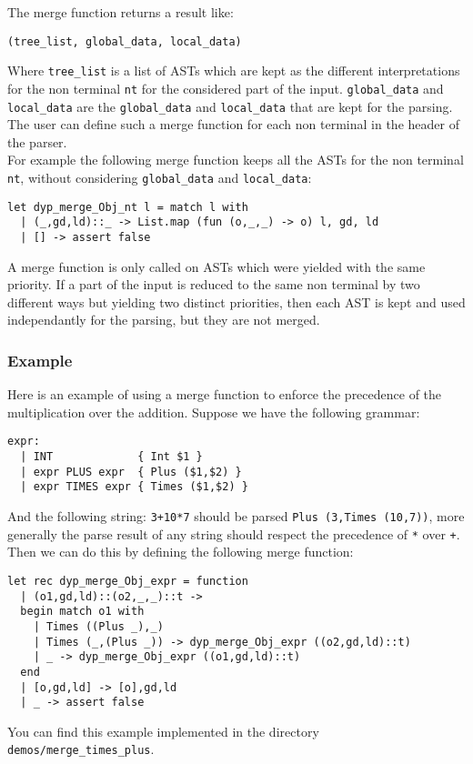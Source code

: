 \documentclass[12pt]{article}
\begin{document}
{The merge function returns a result like:
\begin{verbatim}
(tree_list, global_data, local_data)
\end{verbatim}
Where \verb|tree_list| is a list of ASTs which are kept as the different interpretations for the non terminal \verb|nt| for the considered part of the input. \verb|global_data| and \verb|local_data| are the \verb|global_data| and \verb|local_data| that are kept for the parsing.\\

The user can define such a merge function for each non terminal in the header of the parser.\\

For example the following merge function keeps all the ASTs for the non terminal \verb|nt|, without considering \verb|global_data| and \verb|local_data|:
\begin{verbatim}
let dyp_merge_Obj_nt l = match l with
  | (_,gd,ld)::_ -> List.map (fun (o,_,_) -> o) l, gd, ld
  | [] -> assert false
\end{verbatim}

A merge function is only called on ASTs which were yielded with the same priority. If a part of the input is reduced to the same non terminal by two different ways but yielding two distinct priorities, then each AST is kept and used independantly for the parsing, but they are not merged.

\subsubsection{Example}

Here is an example of using a merge function to enforce the precedence of the multiplication over the addition. Suppose we have the following grammar:
\begin{verbatim}
expr:
  | INT             { Int $1 }
  | expr PLUS expr  { Plus ($1,$2) }
  | expr TIMES expr { Times ($1,$2) }
\end{verbatim}
And the following string: \texttt{3+10*7} should be parsed \texttt{Plus (3,Times (10,7))}, more generally the parse result of any string should respect the precedence of \texttt{*} over \texttt{+}. Then we can do this by defining the following merge function:
\begin{verbatim}
let rec dyp_merge_Obj_expr = function
  | (o1,gd,ld)::(o2,_,_)::t ->
  begin match o1 with
    | Times ((Plus _),_)
    | Times (_,(Plus _)) -> dyp_merge_Obj_expr ((o2,gd,ld)::t)
    | _ -> dyp_merge_Obj_expr ((o1,gd,ld)::t)
  end
  | [o,gd,ld] -> [o],gd,ld
  | _ -> assert false
\end{verbatim}
You can find this example implemented in the directory \verb|demos/merge_times_plus|.\\

}
\end{document}
